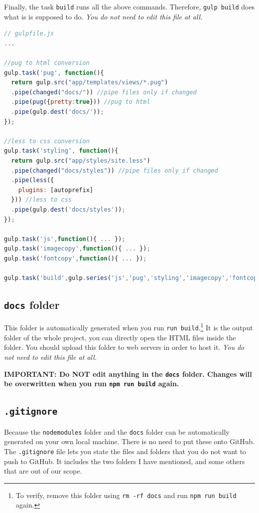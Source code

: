 Finally, the task \texttt{build} runs all the above commands. Therefore, \texttt{gulp build} does what is is supposed to do. \textit{You do not need to edit this file at all.}

\begin{lstlisting}[language=JavaScript]
// gulpfile.js
...

//pug to html conversion
gulp.task('pug', function(){
  return gulp.src("app/templates/views/*.pug")
  .pipe(changed("docs/")) //pipe files only if changed 
  .pipe(pug({pretty:true})) //pug to html
  .pipe(gulp.dest('docs/'));
});

//less to css conversion
gulp.task('styling', function(){
  return gulp.src("app/styles/site.less")
  .pipe(changed("docs/styles")) //pipe files only if changed 
  .pipe(less({
    plugins: [autoprefix]
  })) //less to css
  .pipe(gulp.dest('docs/styles'));
});

gulp.task('js',function(){ ... });
gulp.task('imagecopy',function(){ ... });
gulp.task('fontcopy',function(){ ... });

gulp.task('build',gulp.series('js','pug','styling','imagecopy','fontcopy'));

\end{lstlisting}

\subsection{\texttt{docs} folder}

This folder is automatically generated when you run \texttt{run build}.\footnote{To verify, remove this folder using \texttt{rm -rf docs} and run \texttt{npm run build} again.} It is the output folder of the whole project, you can directly open the HTML files inside the folder. You should upload this folder to web servers in order to host it.
\textit{You do not need to edit this file at all.}
\vspace{6mm}

\textbf{IMPORTANT: Do NOT edit anything in the \texttt{docs} folder. Changes will be overwritten when you run \texttt{npm run build} again.}

\subsection{\texttt{.gitignore}}
\label{sec:gitignore}

Because the \texttt{node\textunderscore modules} folder and the \texttt{docs} folder can be automatically generated on your own local machine. There is no need to put these onto GitHub. The \texttt{.gitignore} file lets you state the files and folders that you do not want to push to GitHub. It includes the two folders I have mentioned, and some others that are out of our scope.

